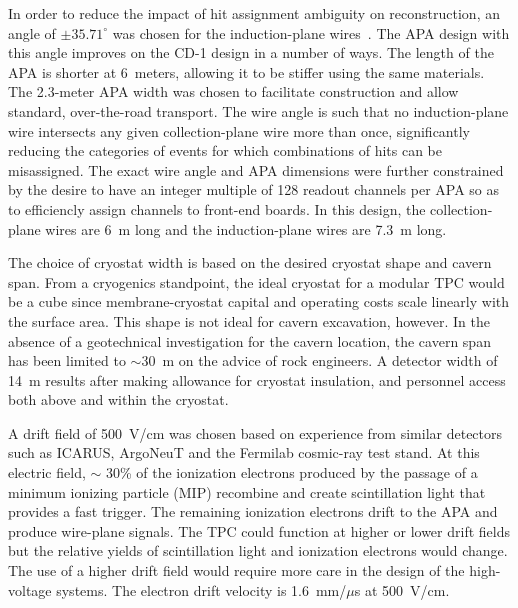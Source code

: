 In order to reduce the impact of hit assignment ambiguity on
reconstruction, an angle of $\pm35.71^\circ$ was chosen for the
induction-plane wires~\cite{docdb-9374,docdb8981,docdb9886}.  The APA
design with this angle improves on the CD-1 design in a number of
ways.  The length of the APA is shorter at 6~meters, allowing it to be
stiffer using the same materials.  The 2.3-meter APA width was chosen
to facilitate construction and allow standard, over-the-road
transport. The wire angle is such that no induction-plane wire
intersects any given collection-plane wire more than once,
significantly reducing the categories of events for which combinations
of hits can be misassigned.  The exact wire angle and APA dimensions
were further constrained by the desire to have an integer multiple of
128 readout channels per APA so as to efficiencly assign channels to
front-end boards.  In this design, the collection-plane wires are 6~m
long and the induction-plane wires are 7.3~m long.

The choice of cryostat width is based on the desired cryostat shape
and cavern span. From a cryogenics standpoint, the ideal cryostat for
a modular TPC would be a cube since membrane-cryostat capital and
operating costs scale linearly with the surface area. This shape is
not ideal for cavern excavation, however. In the absence of a
geotechnical investigation for the cavern location, the cavern span
has been limited to $\sim$30~m on the advice of rock engineers. A
detector width of 14~m results after making allowance for cryostat
insulation, and personnel access both above and within the cryostat.

A drift field of 500~V/cm was chosen based on experience from similar
detectors such as ICARUS, ArgoNeuT and the Fermilab cosmic-ray test
stand. At this electric field, $\sim$ 30\% of the ionization electrons
produced by the passage of a minimum ionizing particle (MIP) recombine
and create scintillation light that provides a fast trigger. The
remaining ionization electrons drift to the APA and produce wire-plane
signals. The TPC could function at higher or lower drift fields but
the relative yields of scintillation light and ionization electrons
would change. The use of a higher drift field would require more care
in the design of the high-voltage systems. The electron drift velocity
is 1.6~mm/$\mu$s at 500~V/cm.

